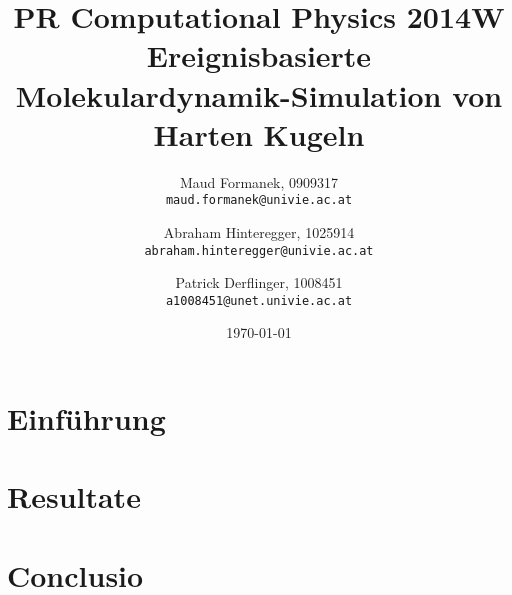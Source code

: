 \documentclass[a4paper]{article}
\title{PR Computational Physics 2014W \\ Ereignisbasierte Molekulardynamik-Simulation von Harten Kugeln}
\author{
	Maud Formanek, 0909317\\
    \texttt{maud.formanek@univie.ac.at}
	\and
    Abraham Hinteregger,  1025914\\
    \texttt{abraham.hinteregger@univie.ac.at}\and
    Patrick Derflinger,  1008451\\
    \texttt{a1008451@unet.univie.ac.at}
    }
\date{\today}
\begin{document}
\maketitle
\listoftodos
\tableofcontents

\newpage

\section{Einführung} \label{einfuehrung}


\section{Resultate} \label{resultate}


\section{Conclusio} \label{conclusio}





\end{document}
